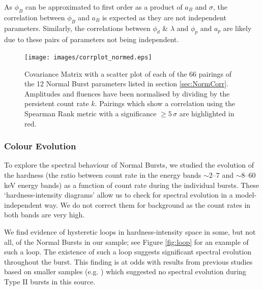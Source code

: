 As $\phi_B$ can be approximated to first order as a product of $a_B$ and $\sigma$, the correlation between $\phi_B$ and $a_B$ is expected as they are not independent parameters.  Similarly, the correlations between $\phi_d$ \& $\lambda$ and $\phi_p$ and $a_p$ are likely due to these pairs of parameters not being independent.

\begin{figure}
  \centering
  \texttt{[image: images/corrplot\_normed.eps]}
  \caption{\small Covariance Matrix with a scatter plot of each of the 66 pairings of the 12 Normal Burst parameters listed in section \ref{sec:NormCorr}.  Amplitudes and fluences have been normalised by dividing by the persistent count rate $k$.  Pairings which show a correlation using the Spearman Rank metric with a significance $\geq5\,\sigma$ are highlighted in red.}
  \label{fig:corr_n}
\end{figure}

\subsubsection{Colour Evolution}

\par To explore the spectral behaviour of Normal Bursts, we studied the evolution of the hardness (the ratio between count rate in the energy bands $\sim2$--$7$ and $\sim8$--$60$\,keV energy bands) as a function of count rate during the individual bursts.  These `hardness-intensity diagrams' allow us to check for spectral evolution in a model-independent way.  We do not correct them for background as the count rates in both bands are very high.
\par We find evidence of hysteretic loops in hardness-intensity space in some, but not all, of the Normal Bursts in our sample; see Figure \ref{fig:loop} for an example of such a loop.  The existence of such a loop suggests significant spectral evolution throughout the burst.  This finding is at odds with results from previous studies based on smaller samples (e.g. \citealp{Woods_OB2}) which suggested no spectral evolution during Type II bursts in this source. %

